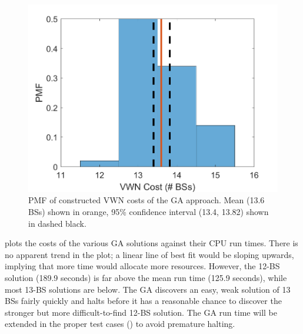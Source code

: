\documentclass[12pt,dvipsnames]{report}
\begin{document}
\begin{figure}[ht]
	\centering
	\includegraphics[height=0.45\textheight]{Figures/Prelim_GACostsPMF}
	\caption[GA approach VWN cost trend for preliminary simulations]{PMF of constructed VWN costs of the GA approach.  Mean (13.6 BSs) shown in orange, 95\% confidence interval (13.4, 13.82) shown in dashed black.}
	\label{fig:Prelim_GACostsPMF}
\end{figure}

 plots the costs of the various GA solutions against their CPU run times.  There is no apparent trend in the plot; a linear line of best fit would be sloping upwards, implying that more time would allocate more resources.  However, the 12-BS solution (189.9 seconds) is far above the mean run time (125.9 seconds), while most 13-BS solutions are below.  The GA discovers an easy, weak solution of 13 BSs fairly quickly and halts before it has a reasonable chance to discover the stronger but more difficult-to-find 12-BS solution.  The GA run time will be extended in the proper test cases () to avoid premature halting.
\end{document}
